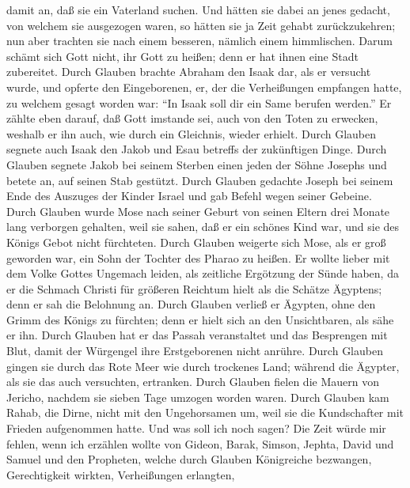 damit an, daß sie ein Vaterland suchen.  Und hätten sie
dabei an jenes gedacht, von welchem sie ausgezogen waren, so hätten sie
ja Zeit gehabt zurückzukehren;  nun aber trachten sie
nach einem besseren, nämlich einem himmlischen. Darum schämt sich Gott
nicht, ihr Gott zu heißen; denn er hat ihnen eine Stadt zubereitet.
 Durch Glauben brachte Abraham den Isaak dar, als er
versucht wurde, und opferte den Eingeborenen, er, der die Verheißungen
empfangen hatte,  zu welchem gesagt worden war: ``In
Isaak soll dir ein Same berufen werden.''  Er zählte eben
darauf, daß Gott imstande sei, auch von den Toten zu erwecken, weshalb
er ihn auch, wie durch ein Gleichnis, wieder erhielt. 
Durch Glauben segnete auch Isaak den Jakob und Esau betreffs der
zukünftigen Dinge.  Durch Glauben segnete Jakob bei
seinem Sterben einen jeden der Söhne Josephs und betete an, auf seinen
Stab gestützt.  Durch Glauben gedachte Joseph bei seinem
Ende des Auszuges der Kinder Israel und gab Befehl wegen seiner Gebeine.
 Durch Glauben wurde Mose nach seiner Geburt von seinen
Eltern drei Monate lang verborgen gehalten, weil sie sahen, daß er ein
schönes Kind war, und sie des Königs Gebot nicht fürchteten.
 Durch Glauben weigerte sich Mose, als er groß geworden
war, ein Sohn der Tochter des Pharao zu heißen.  Er
wollte lieber mit dem Volke Gottes Ungemach leiden, als zeitliche
Ergötzung der Sünde haben,  da er die Schmach Christi für
größeren Reichtum hielt als die Schätze Ägyptens; denn er sah die
Belohnung an.  Durch Glauben verließ er Ägypten, ohne den
Grimm des Königs zu fürchten; denn er hielt sich an den Unsichtbaren,
als sähe er ihn.  Durch Glauben hat er das Passah
veranstaltet und das Besprengen mit Blut, damit der Würgengel ihre
Erstgeborenen nicht anrühre.  Durch Glauben gingen sie
durch das Rote Meer wie durch trockenes Land; während die Ägypter, als
sie das auch versuchten, ertranken.  Durch Glauben fielen
die Mauern von Jericho, nachdem sie sieben Tage umzogen worden waren.
 Durch Glauben kam Rahab, die Dirne, nicht mit den
Ungehorsamen um, weil sie die Kundschafter mit Frieden aufgenommen
hatte.  Und was soll ich noch sagen? Die Zeit würde mir
fehlen, wenn ich erzählen wollte von Gideon, Barak, Simson, Jephta,
David und Samuel und den Propheten,  welche durch Glauben
Königreiche bezwangen, Gerechtigkeit wirkten, Verheißungen erlangten,
